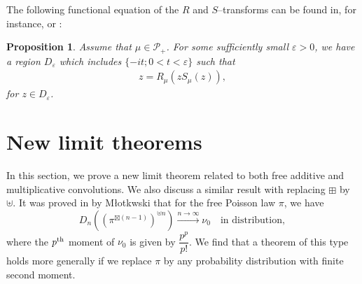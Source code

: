 \documentclass[12pt]{amsart}
\newtheorem{prop}[thm]{Proposition}
\theoremstyle{definition}
\numberwithin{equation}{section}
\begin{document}
The following functional equation of the $R$ and $S$--transforms can be found
in, for instance, \cite{NiSp06} or \cite[Lemma 2]{PAS09}:
\begin{prop}\label{Scum}
	Assume that $\mu\in\mathcal{P}_+$. 
	For some sufficiently small $\varepsilon>0$, 
	we have a region $D_{\varepsilon}$ which includes 
    $\{ -it ; 0 < t <\varepsilon \}$ 
	such that
		\begin{align}
		z = R_{\mu} \left(zS_{\mu}(z)\right),
		\end{align}
	for $z\in D_{\varepsilon}$.
\end{prop}
 
\section{New limit theorems}
In this section, 
we prove a new limit theorem related 
to both free additive and multiplicative convolutions.
We also discuss a similar result with replacing $\boxplus$ by $\uplus$.
It was proved in \cite{Ml10} by M\l otkwski 
that for the free Poisson law $\pi$, we have
	\[
	D_{n}\left(\left(\pi^{\boxtimes (n-1)}\right)^{\uplus n}\right) 
	\overset{n\to \infty}{\longrightarrow} \nu_0 
    \quad \mbox{in distribution},
	\]
where the $p^{\scriptsize \mbox{th}}$ moment of $\nu_0$ is given by $\dfrac{p^p}{p!}$.
We find that a theorem of this type holds more generally if we replace $\pi$ 
by any probability distribution with finite second moment.
\end{document}
